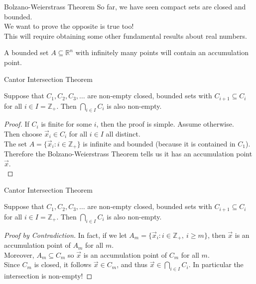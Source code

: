 \documentclass{beamer}
\begin{document}
\begin{frame}{Bolzano-Weierstrass Theorem}
So far, we have seen compact sets are closed and bounded.\\
\pause
We want to prove the opposite is true too!\\
\pause
This will require obtaining some other fundamental results about real numbers.
\pause
\begin{thm}
A bounded set $A\subseteq \mathbb{R}^n$ with infinitely many points will contain an accumulation point.
\end{thm}
\end{frame}

\begin{frame}{Cantor Intersection Theorem}
\begin{thm}
Suppose that $C_1,C_2,C_3,\dots$ are non-empty closed, bounded sets with $C_{i+1}\subseteq C_i$ for all $i\in I = \mathbb{Z}_+$.
Then $\bigcap_{i\in I} C_i$ is also non-empty.
\end{thm}
\pause
\begin{proof}
\pause
If $C_i$ is finite for some $i$, then the proof is simple. Assume otherwise.\\
\pause
Then choose $\vec x_i\in C_i$ for all $i\in I$ all distinct.\\
\pause
The set $A = \{\vec x_i: i\in \mathbb{Z}_+\}$ is infinite and bounded (because it is contained in $C_1$).\\
\pause
Therefore the Bolzano-Weierstrass Theorem tells us it has an accumulation point $\vec x$.\\
\end{proof}
\end{frame}

\begin{frame}{Cantor Intersection Theorem}
\begin{thm}
Suppose that $C_1,C_2,C_3,\dots$ are non-empty closed, bounded sets with $C_{i+1}\subseteq C_i$ for all $i\in I = \mathbb{Z}_+$.
Then $\bigcap_{i\in I} C_i$ is also non-empty.
\end{thm}
\pause
\begin{proof}[Proof by Contradiction]
\pause
In fact, if we let $A_m = \{\vec x_i: i\in \mathbb{Z}_+,\ i\geq m\}$, then $\vec x$ is an accumulation point of $A_m$ for all $m$.\\
\pause
Moreover, $A_m\subseteq C_m$ so $\vec x$ is an accumulation point of $C_m$ for all $m$.\\
\pause
Since $C_m$ is closed, it follows $\vec x\in C_m$, and thus $\vec x\in \bigcap_{i\in I} C_i$.
\pause
In particular the intersection is non-empty!
\end{proof}
\end{frame}
\end{document}
